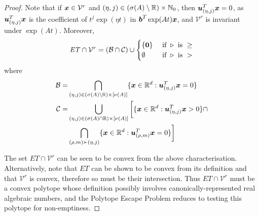 \begin{proof}
Note that if $\boldsymbol{x}\in\mathcal{V}^{r}$ and $(\eta,j)\in
(\sigma(A)\setminus \mathbb{R})\times \mathbb{N}_{0}$, then
$\boldsymbol{u}_{(\eta,j)}^{T}\boldsymbol{x}=0$, as
$\boldsymbol{u}_{(\eta,j)}^{T}\boldsymbol{x}$ is the coefficient of $t^{j} \exp(\eta
t)$ in $\boldsymbol{b}^{T}\exp(At) \boldsymbol{x}$, and $\mathcal{V}^{r}$ is
invariant under $\exp(At)$. Moreover,
%
\begin{align*}
\mathit{ET}\cap\mathcal{V}^{r}=(\mathcal{B}\cap\mathcal{C}) \cup
\begin{cases}
\lbrace \boldsymbol{0} \rbrace & \text{ if } \triangleright \text{ is } \geq \\
\emptyset & \text{ if } \triangleright \text{ is } >
\end{cases}
\end{align*}
where
\begin{align*}
\mathcal{B}=&\bigcap\limits_{(\eta,j)\in (\sigma(A)\setminus \mathbb{R})\times [\nu(A)]} \lbrace \boldsymbol{x}\in\mathbb{R}^{d}: \boldsymbol{u}_{(\eta,j)}^{T} \boldsymbol{x}=0 \rbrace \\
\mathcal{C}=&\bigcup\limits_{(\eta,j)\in(\sigma(A)\cap \mathbb{R})\times [\nu(A)]} \bigg[ \lbrace \boldsymbol{x}\in\mathbb{R}^{d}: \boldsymbol{u}_{(\eta,j)}^{T} \boldsymbol{x}>0 \rbrace \cap \\
&\bigcap\limits_{(\rho,m)\succ (\eta,j)} \lbrace \boldsymbol{x}\in\mathbb{R}^{d}: \boldsymbol{u}_{(\rho,m)}^{T} \boldsymbol{x}=0 \rbrace \bigg]
\end{align*}

The set $\mathit{ET}\cap\mathcal{V}^{r}$ can be seen to be convex from
the above characterisation. Alternatively, note that $\mathit{ET}$ can
be shown to be convex from its definition and that $\mathcal{V}^{r}$
is convex, therefore so must be their intersection. Thus
$\mathit{ET}\cap\mathcal{V}^{r}$ must be a convex polytope whose
definition possibly involves canonically-represented real algebraic
numbers, and the Polytope Escape Problem reduces to testing this
polytope for non-emptiness.
\end{proof}

